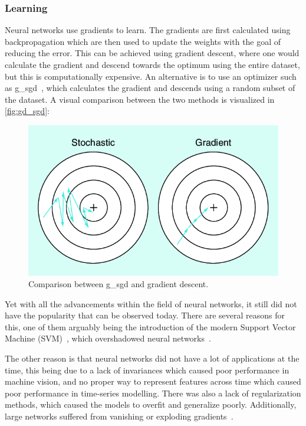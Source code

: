 \subsubsection{Learning}
Neural networks use gradients to learn. The gradients are first calculated using backpropagation which are then used to update the weights with the goal of reducing the error. This can be achieved using gradient descent, where one would calculate the gradient and descend towards the optimum using the entire dataset, but this is computationally expensive. An alternative is to use an optimizer such as \gls*{g_sgd}~\cite{sgd}, which calculates the gradient and descends using a random subset of the dataset. A visual comparison between the two methods is visualized in \autoref{fig:gd_sgd}:
\begin{figure}[H]
    \centering
    \includegraphics[width=0.8\linewidth]{resources/related_works/gradient_descent}
    \caption[Gradient Descent Comparison]{Comparison between \gls*{g_sgd} and gradient descent.}
    \label{fig:gd_sgd}
\end{figure}
\par
Yet with all the advancements within the field of neural networks, it still did not have the popularity that can be observed today. There are several reasons for this, one of them arguably being the introduction of the modern Support Vector Machine (SVM)~\cite{svm}, which overshadowed neural networks~\cite{kuncheva2019pattern}.
\par
The other reason is that neural networks did not have a lot of applications at the time, this being due to a lack of invariances which caused poor performance in machine vision, and no proper way to represent features across time which caused poor performance in time-series modelling. There was also a lack of regularization methods, which caused the models to overfit and generalize poorly. Additionally, large networks suffered from vanishing or exploding gradients~\cite{exploding_vanishing_gradients}.
